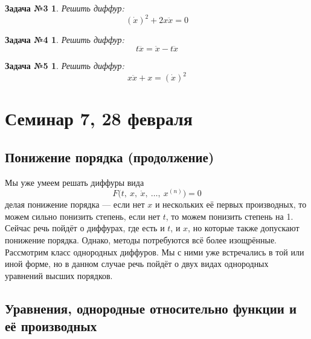 \documentclass[a4paper,12pt]{article}
\newtheorem*{task3}{Задача №3}
\newtheorem*{task4}{Задача №4}
\newtheorem*{task5}{Задача №5}
\newcommand{\dx}{\dot{x}}
\newcommand{\ddx}{\ddot{x}}
\newcommand{\dddx}{\dddot{x}}
\begin{document}
\begin{task3}
	Решить диффур:
	\[(\dx)^2 + 2x\ddx = 0\]
\end{task3}
%	

\begin{task4}
	Решить диффур:
	\[t\dddx = \ddx - t\ddx\]
\end{task4}
%

\begin{task5}
	Решить диффур:
	\[x\ddx + x = (\dx)^2\]
\end{task5}
%	


\newpage
\section{Семинар 7, 28 февраля}

\subsection{Понижение порядка (продолжение)}

Мы уже умеем решать диффуры вида 
\[F\big(t,\ x,\ \dx,\ \ldots,\ x^{(n)}\big) = 0\] делая понижение порядка --- если нет $x$ и нескольких её первых производных, то можем сильно понизить степень, если нет $t$, то можем понизить степень на 1. Сейчас речь пойдёт о диффурах, где есть и $t$, и $x$, но которые также допускают понижение порядка. Однако, методы потребуются всё более изощрённые. Рассмотрим класс однородных диффуров. Мы с ними уже встречались в той или иной форме, но в данном случае речь пойдёт о двух видах однородных уравнений высших порядков.

\subsection{Уравнения, однородные относительно функции и её производных}
\end{document}
